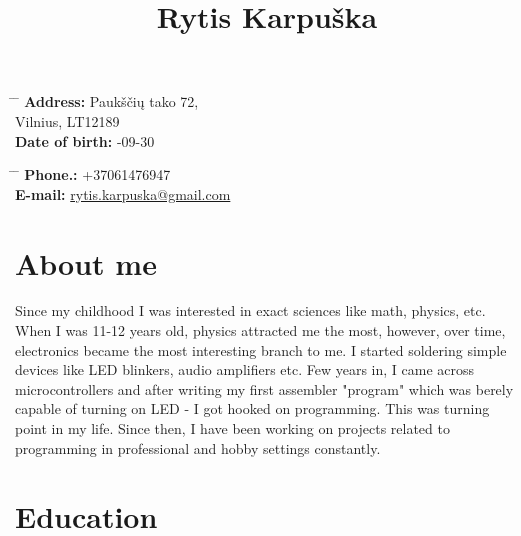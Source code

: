 \documentclass[12]{article}
\begin{document}
\title{Rytis Karpuška}


\parbox{0.5\textwidth}{ %
\begin{tabbing} %
\hspace{3cm} \= \hspace{4cm} \= \kill %
{\bf Address:} \> Paukščių tako 72,\\ %
\> Vilnius, LT12189\\ %
{\bf Date of birth:} -09-30\\ %
\end{tabbing}}
\hfill %
\parbox{0.5\textwidth}{ %
\begin{tabbing} %
\hspace{3cm} \= \hspace{4cm} \= \kill %
{\bf Phone.:} \> +37061476947 \\ %
{\bf E-mail:} \> \href{mailto:rytis.karpuska@gmail.com}{rytis.karpuska@gmail.com} \\ %
\end{tabbing}}

\section{About me}

Since my childhood I was interested in exact sciences like math, physics, etc.
When I was 11-12 years old, physics attracted me the most, however, over time, electronics became the most interesting branch to me.
I started soldering simple devices like LED blinkers, audio amplifiers etc.
Few years in, I came across microcontrollers and after writing my first assembler "program" which was berely capable of turning on LED - I got hooked on programming.
This was turning point in my life.
Since then, I have been working on projects related to programming in professional and hobby settings constantly.

\section{Education}

\end{document}

